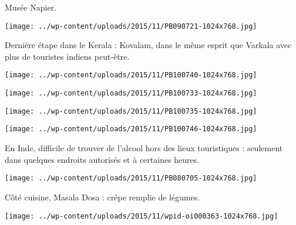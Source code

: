  Musée Napier. 
\begin{center} \texttt{[image: ../wp-content/uploads/2015/11/PB090721-1024x768.jpg]} \end{center}

\pagebreak
 Dernière étape dans le Kerala : Kovalam, dans le même esprit que Varkala avec plus de touristes indiens peut-être. 
\begin{center} \texttt{[image: ../wp-content/uploads/2015/11/PB100740-1024x768.jpg]} \end{center}
\begin{center} \texttt{[image: ../wp-content/uploads/2015/11/PB100733-1024x768.jpg]} \end{center}
\begin{center} \texttt{[image: ../wp-content/uploads/2015/11/PB100735-1024x768.jpg]} \end{center}
\begin{center} \texttt{[image: ../wp-content/uploads/2015/11/PB100746-1024x768.jpg]} \end{center}

\pagebreak
 En Inde, difficile de trouver de l'alcool hors des lieux touristiques : seulement dans quelques endroits autorisés et à certaines heures. 
\begin{center} \texttt{[image: ../wp-content/uploads/2015/11/PB080705-1024x768.jpg]} \end{center}

  Côté cuisine, Masala Dosa : crêpe remplie de légumes.
\begin{center} \texttt{[image: ../wp-content/uploads/2015/11/wpid-oi000363-1024x768.jpg]} \end{center}